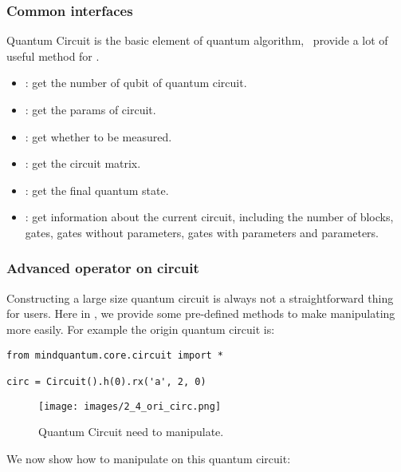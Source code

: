 \subsubsection{Common interfaces}

Quantum Circuit is the basic element of quantum algorithm, \MindQuantum\ provide a lot of useful method for \Circuit.

\begin{itemize}
    \item \propnqubits: get the number of qubit of quantum circuit.
    \item \propparamsname: get the params of circuit.
    \item \prophasmeasuregate: get whether to be measured.
    \item \methodmatrix: get the circuit matrix.
    \item \methodgetqs: get the final quantum state.
    \item \methodsummary: get information about the current circuit, including the number of blocks, gates, gates without parameters, gates with parameters and parameters.
\end{itemize}

\subsubsection{Advanced operator on circuit}

Constructing a large size quantum circuit is always not a straightforward thing for users. Here in \MindQuantum, we provide some pre-defined methods to make manipulating \Circuit more easily. For example the origin quantum circuit is:

\begin{lstlisting}
from mindquantum.core.circuit import *

circ = Circuit().h(0).rx('a', 2, 0)
\end{lstlisting}

\begin{figure}[H]
    \begin{center}
        \texttt{[image: images/2\_4\_ori\_circ.png]}
    \end{center}
    \caption{Quantum Circuit need to manipulate.}
\end{figure}
We now show how to manipulate on this quantum circuit:


